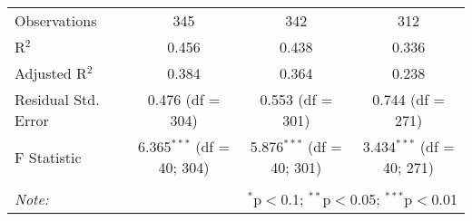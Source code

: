 \begin{table}[!htbp]
\begin{tabular}{@{\extracolsep{5pt}}lccc}
Observations & 345 & 342 & 312 \\ 
R$^{2}$ & 0.456 & 0.438 & 0.336 \\ 
Adjusted R$^{2}$ & 0.384 & 0.364 & 0.238 \\ 
Residual Std. Error & 0.476 (df = 304) & 0.553 (df = 301) & 0.744 (df = 271) \\ 
F Statistic & 6.365$^{***}$ (df = 40; 304) & 5.876$^{***}$ (df = 40; 301) & 3.434$^{***}$ (df = 40; 271) \\ 
\hline 
\hline \\[-1.8ex] 
\textit{Note:}  & \multicolumn{3}{r}{$^{*}$p$<$0.1; $^{**}$p$<$0.05; $^{***}$p$<$0.01} \\ 
\end{tabular} 
\end{table} 

